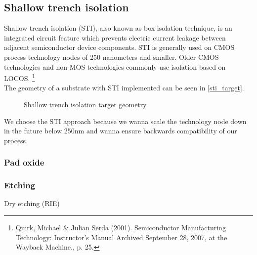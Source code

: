 \subsection{Shallow trench isolation}\label{sti}
Shallow trench isolation (STI), also known as box isolation technique, is an integrated circuit feature which prevents electric current leakage between adjacent semiconductor device components.
STI is generally used on CMOS process technology nodes of 250 nanometers and smaller.
Older CMOS technologies and non-MOS technologies commonly use isolation based on LOCOS.
\footnote{Quirk, Michael \& Julian Serda (2001). Semiconductor Manufacturing Technology: Instructor's Manual Archived September 28, 2007, at the Wayback Machine., p. 25.} \\
The geometry of a substrate with STI implemented can be seen in \autoref{sti_target}.

\begin{figure}[H]
	\centering
	\begin{tikzpicture}[node distance = 3cm, auto, thick,scale=\CrossAndTopSectionBig, every node/.style={transform shape}]
		
	\end{tikzpicture}
	\begin{tikzpicture}[node distance = 3cm, auto, thick,scale=\CrossAndTopSectionBig, every node/.style={transform shape}]
		
	\end{tikzpicture}
	\caption{Shallow trench isolation target geometry}
	\label{sti_target}
\end{figure}

We choose the STI approach because we wanna scale the technology node down in the future below 250nm and wanna ensure backwards compatibility of our process.

\subsubsection{Pad oxide}
\subsubsection{Etching}
Dry etching (RIE)